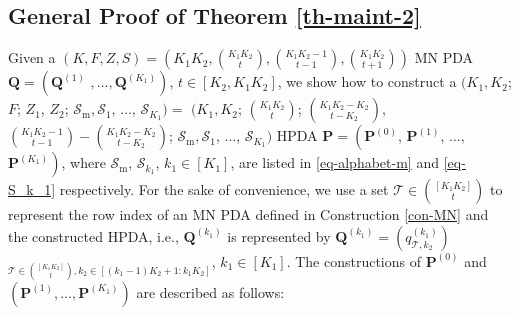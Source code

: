\documentclass[onecolumn,10pt]{IEEEtran}
\theoremstyle{mythm}
\begin{document}
{\subsection{ General Proof of Theorem \ref{th-maint-2}}
\label{sub-proof-th2}
Given  a $(K,F,Z,S)=$$(K_1K_2,{K_1K_2\choose t},{K_1K_2-1\choose t-1},{K_1K_2\choose t+1})$ MN PDA $\mathbf{Q}=\left(\mathbf{Q}^{(1)}\right.$ $\left.,\ldots,\mathbf{Q}^{(K_1)}\right)$, $t\in[K_2,K_1K_2]$, we show how to construct a $(K_1,K_2$; $F$; $Z_1$, $Z_2$; $\mathcal{S}_\text{m},\mathcal{S}_1$, $\ldots$, $\mathcal{S}_{K_1})=$ $(K_1,K_2$; ${K_1K_2\choose t}$; ${K_1K_2-K_2\choose t-K_2}$, ${K_1K_2-1\choose t-1}-{K_1K_2-K_2\choose t-K_2}$; $\mathcal{S}_\text{m},\mathcal{S}_1$, $\ldots$, $\mathcal{S}_{K_1})$ HPDA  $\mathbf{P}=\left(\mathbf{P}^{(0)}\right.$, $\mathbf{P}^{(1)}$, $\ldots$, $\left.\mathbf{P}^{(K_1)}\right)$, where $\mathcal{S}_{\text{m}}$, $\mathcal{S}_{k_1}$, $k_1\in[K_1]$, are listed in \eqref{eq-alphabet-m} and \eqref{eq-S_k_1} respectively. For the sake of convenience, we use a set $\mathcal{T}\in {[K_1K_2]\choose t}$ to represent the row index of an MN PDA defined in Construction \ref{con-MN} and the constructed HPDA, i.e., $\mathbf{Q}^{(k_1)}$ is represented by $\mathbf{Q}^{(k_1)}=(q^{(k_1)}_{\mathcal{T},k_2})$ $_{\mathcal{T}\in {[K_1K_2]\choose t}, k_2\in[(k_1-1)K_2+1:k_1K_2]}$, $k_1\in[K_1]$.
 The  constructions of $\mathbf{P}^{(0)}$ and  $(\mathbf{P}^{(1)}, \ldots, \mathbf{P}^{(K_1)} )$ are described  as follows:


}
\end{document}
